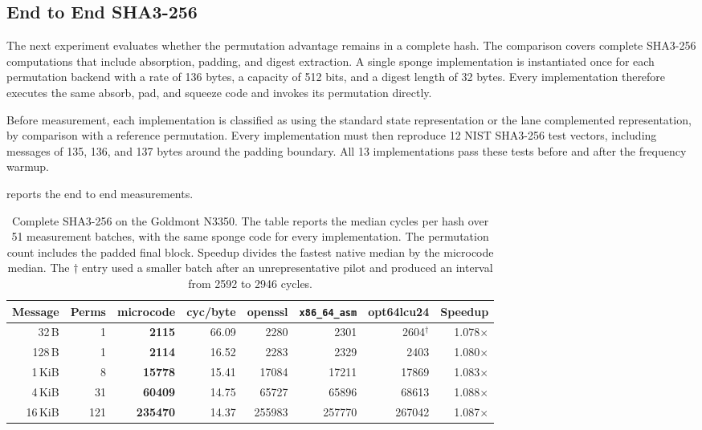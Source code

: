 \documentclass[journal=tches,submission]{iacrtrans}
\begin{document}
\subsection{End to End SHA3-256}
\label{sec:keccak-sha3}

The next experiment evaluates whether the permutation advantage remains in a complete hash. 
The comparison covers complete SHA3-256 computations that include absorption, padding, and digest extraction. 
A single sponge implementation is instantiated once for each permutation backend with a rate of
136 bytes, a capacity of 512 bits, and a digest length of 32 bytes. 
Every implementation therefore executes the same absorb, pad, and squeeze code and invokes its permutation directly.

Before measurement, each implementation is classified as using the standard
state representation or the lane complemented representation, by comparison with a reference permutation. 
Every implementation must then reproduce 12 NIST SHA3-256 test vectors, including messages of 135, 136, and 137 bytes around the padding boundary. 
All 13 implementations pass these tests before and after the frequency warmup.

 reports the end to end measurements.

\begin{table}[htbp]
\centering
\caption{Complete SHA3-256 on the Goldmont N3350. 
The table reports the median cycles per hash over 51 measurement batches, with the same sponge code for every
implementation. The permutation count includes the padded final block. 
Speedup divides the fastest native median by the microcode median. 
The $\dagger$ entry used a smaller batch after an unrepresentative pilot and produced an interval from 2592 to 2946 cycles.
}
\label{tab:results-sha3}
\footnotesize
\setlength{\tabcolsep}{4pt}
\begin{tabular}{@{}rrrrrrrr@{}}
\toprule
Message & Perms & \textbf{microcode} & cyc/byte & openssl & \texttt{x86\_64\_asm} & opt64lcu24 & Speedup \\
\midrule
32\,B      & 1   & \textbf{2115}   & 66.09 & 2280   & 2301   & 2604$^{\dagger}$ & 1.078$\times$ \\
128\,B     & 1   & \textbf{2114}   & 16.52 & 2283   & 2329   & 2403   & 1.080$\times$ \\
1\,KiB     & 8   & \textbf{15778}  & 15.41 & 17084  & 17211  & 17869  & 1.083$\times$ \\
4\,KiB     & 31  & \textbf{60409}  & 14.75 & 65727  & 65896  & 68613  & 1.088$\times$ \\
16\,KiB    & 121 & \textbf{235470} & 14.37 & 255983 & 257770 & 267042 & 1.087$\times$ \\
\bottomrule
\end{tabular}
\end{table}
\end{document}
